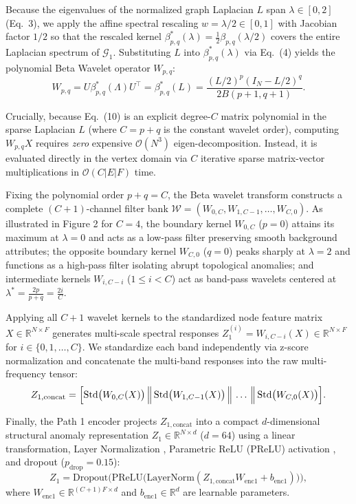 \documentclass[10pt,a4paper,twocolumn]{article}
\begin{document}
Because the eigenvalues of the normalized graph Laplacian $L$ span $\lambda \in [0, 2]$ (Eq.\ 3), we apply the affine spectral rescaling $w = \lambda/2 \in [0, 1]$ with Jacobian factor $1/2$ so that the rescaled kernel $\beta_{p,q}^*(\lambda) = \frac{1}{2}\beta_{p,q}(\lambda/2)$ covers the entire Laplacian spectrum of $\mathscr{G}_1$. Substituting $L$ into $\beta_{p,q}^*(\lambda)$ via Eq.\ (4) yields the polynomial Beta Wavelet operator $W_{p,q}$:
\begin{equation}
  W_{p,q} = U \beta_{p,q}^*(\Lambda) U^\top = \beta_{p,q}^*(L) = \frac{(L/2)^p (I_N - L/2)^q}{2 B(p+1, q+1)}.
\end{equation}

Crucially, because Eq.\ (10) is an explicit degree-$C$ matrix polynomial in the sparse Laplacian $L$ (where $C = p + q$ is the constant wavelet order), computing $W_{p,q}X$ requires \textit{zero} expensive $\mathscr{O}(N^3)$ eigen-decomposition. Instead, it is evaluated directly in the vertex domain via $C$ iterative sparse matrix-vector multiplications in $\mathscr{O}(C|E|F)$ time.

Fixing the polynomial order $p + q = C$, the Beta wavelet transform constructs a complete $(C+1)$-channel filter bank $\mathscr{W} = (W_{0,C}, W_{1,C-1}, \dots, W_{C,0})$. As illustrated in Figure 2 for $C=4$, the boundary kernel $W_{0,C}$ ($p=0$) attains its maximum at $\lambda = 0$ and acts as a low-pass filter preserving smooth background attributes; the opposite boundary kernel $W_{C,0}$ ($q=0$) peaks sharply at $\lambda = 2$ and functions as a high-pass filter isolating abrupt topological anomalies; and intermediate kernels $W_{i,C-i}$ ($1 \le i < C$) act as band-pass wavelets centered at $\lambda^* = \frac{2p}{p+q} = \frac{2i}{C}$.

Applying all $C+1$ wavelet kernels to the standardized node feature matrix $X \in \mathbb{R}^{N \times F}$ generates multi-scale spectral responses $Z_1^{(i)} = W_{i,C-i}(X) \in \mathbb{R}^{N \times F}$ for $i \in \{0, 1, \dots, C\}$. We standardize each band independently via z-score normalization and concatenate the multi-band responses into the raw multi-frequency tensor:
\begin{equation}
  \resizebox{0.89\linewidth}{!}{$\displaystyle Z_{1,\text{concat}} = \Big[\text{Std}\big(W_{0,C}(X)\big) \,\Big\|\, \text{Std}\big(W_{1,C-1}(X)\big) \,\Big\|\, \dots \,\Big\|\, \text{Std}\big(W_{C,0}(X)\big)\Big].$}
\end{equation}

Finally, the Path 1 encoder projects $Z_{1,\text{concat}}$ into a compact $d$-dimensional structural anomaly representation $Z_1 \in \mathbb{R}^{N \times d}$ ($d = 64$) using a linear transformation, Layer Normalization \cite{ref55}, Parametric ReLU (PReLU) activation \cite{ref56}, and dropout ($p_{\text{drop}} = 0.15$):
\begin{equation}
  Z_1 = \text{Dropout}\Big(\text{PReLU}\big(\text{LayerNorm}(Z_{1,\text{concat}} W_{\text{enc1}} + b_{\text{enc1}})\big)\Big),
\end{equation}
\noindent where $W_{\text{enc1}} \in \mathbb{R}^{(C+1)F \times d}$ and $b_{\text{enc1}} \in \mathbb{R}^d$ are learnable parameters.
\end{document}
